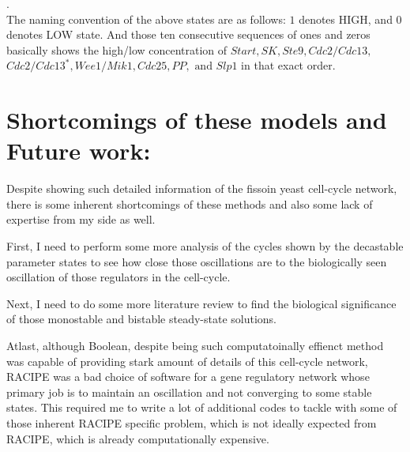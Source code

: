\documentclass{article}
\begin{document}
. \\
The naming convention of the above states are as follows: $1$ denotes HIGH, 
and $0$ denotes LOW state. And those ten consecutive sequences of ones and zeros
basically shows the high/low concentration of $Start, SK, Ste9, Cdc2/Cdc13,$ 
$Cdc2/Cdc13^*, Wee1/Mik1, Cdc25, PP, \mbox{ and } Slp1$ in that exact order.

\section*{Shortcomings of these models and Future work:}
Despite showing such detailed information of the fissoin yeast cell-cycle network,
there is some inherent shortcomings of these methods and also some lack of 
expertise from my side as well. 

First, I need to perform some more analysis of the cycles shown by the decastable 
parameter states to see how close those oscillations are to the biologically 
seen oscillation of those regulators in the cell-cycle. 

Next, I need to do some more literature review to find the biological 
significance of those monostable and bistable steady-state solutions.

Atlast, although Boolean, despite being such computatoinally effienct method was
capable of providing stark amount of details of this cell-cycle network, 
RACIPE was a bad choice of software for a gene regulatory network whose primary 
job is to maintain an oscillation and not converging to some stable states. This 
required me to write a lot of additional codes to tackle with some of those 
inherent RACIPE specific problem, which is not ideally expected from RACIPE, 
which is already computationally expensive.
 

\end{document}
